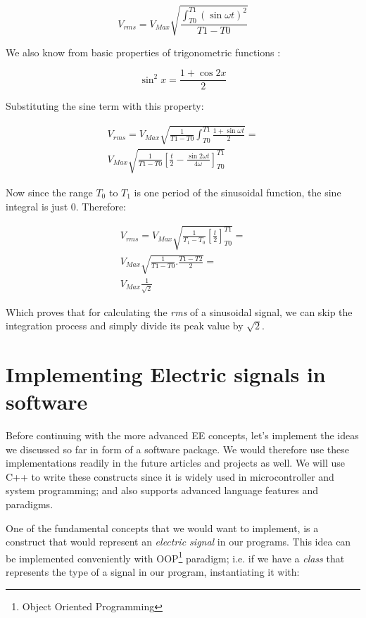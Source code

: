 \documentclass{article}
\begin{document}
	$$V_{rms} = V_{Max} \sqrt{\frac{\int_{T0}^{T1} (\sin \omega t) ^ 2}{T1 - T0}}$$
	
	We also know from basic properties of trigonometric functions :
	
	$$ \sin^2 x = \frac{1 + \cos 2x}{2} $$
	
	Substituting the sine term with this property:
	
	\begin{align} 
	V_{rms} = V_{Max} \sqrt{\frac{1}{{T1 - T0}}{\int_{T0}^{T1} \frac{1 + \sin \omega t}{2}}} = \\
	 V_{Max} \sqrt{\frac{1}{T1 - T0} \left[ \frac{t}{2} - \frac{\sin 2 \omega t}{4 \omega}\right]_{T0}^{T1} }
	\end{align}
	
	Now since the range $T_0$ to $T_1$ is one period of the sinusoidal function, the sine integral is just $0$. Therefore:
		
	\begin{equation}
	\begin{gathered}
	V_{rms} = V_{Max} \sqrt{\frac{1}{T_1 - T_0} \left[ \frac{t}{2} \right]_{T0}^{T1}} = \\
	V_{Max}\sqrt{\frac{1}{T1 - T0} . \frac{T1 - T2}{2}} = \\
 V_{Max} \frac{1}{\sqrt{2}}
	\end{gathered}
	\end{equation}

	Which proves that for calculating the \textit{rms} of a sinusoidal signal, we can skip the integration process and simply divide its peak value by $\sqrt{2}$.

	
	\section{Implementing Electric signals in software}
	Before continuing with the more advanced EE concepts, let's implement the ideas we discussed so far in form of a software package. We would therefore use these implementations readily in the future articles and projects as well. We will use C++ to write these constructs since it is widely used in microcontroller and system programming; and also supports advanced language features and paradigms.
	
	One of the fundamental concepts that we would want to implement, is a construct that would represent an \textit{electric signal} in our programs. This idea can be implemented conveniently with OOP\footnote[1]{Object Oriented Programming} paradigm; i.e. if we have a \textit{class} that represents the type of a signal in our program, instantiating it with:
	
\end{document}
